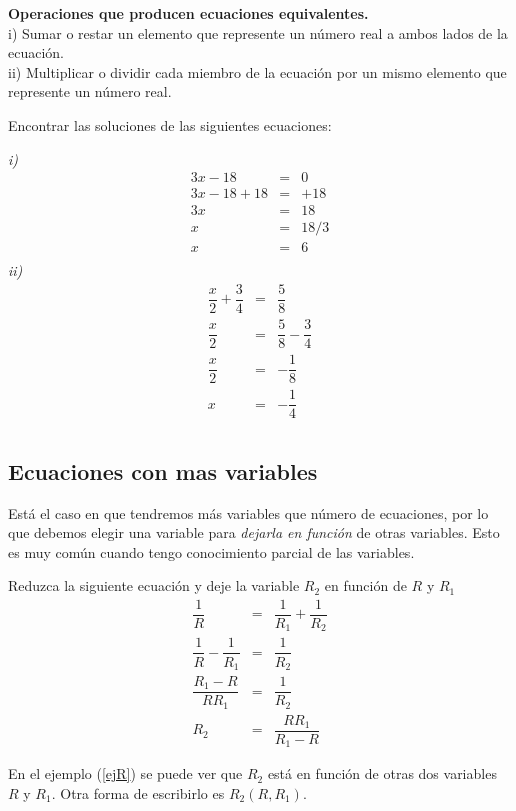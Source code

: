 \begin{mydef}
\textbf{Operaciones que producen ecuaciones equivalentes. }\\

\noindent i) Sumar o restar un elemento que represente un número real a ambos lados de la ecuación. \\

\noindent ii) Multiplicar o dividir cada miembro de la ecuación por un mismo elemento que represente un número real.\\
\end{mydef} 
\newpage
\begin{myexample}
Encontrar las soluciones de las siguientes ecuaciones:
\end{myexample}
\noindent\textit{i)}
\begin{eqnarray*}
3x-18&=&0\\
3x-18+18&=&+18\\
3x&=&18\\
x&=&18/3\\
x&=&6\\
\end{eqnarray*}
\noindent\textit{ii)}
\begin{eqnarray*}
\dfrac{x}{2}+\dfrac{3}{4}&=&\dfrac{5}{8}\\
\dfrac{x}{2}&=&\dfrac{5}{8}-\dfrac{3}{4}\\
\dfrac{x}{2}&=&-\dfrac{1}{8}\\
x&=&-\dfrac{1}{4}\\
\end{eqnarray*}

\subsection{Ecuaciones con mas variables}
Está el caso en que tendremos más variables que número de ecuaciones, por lo que debemos elegir una variable para \textit{dejarla en función} de otras variables. Esto es muy común cuando tengo conocimiento parcial de las variables.
\begin{myexample}
Reduzca la siguiente ecuación y deje la variable $R_{2}$ en función de  $R$ y $R_{1}$
\begin{eqnarray*}
\dfrac{1}{R}&=&\dfrac{1}{R_{1}}+\dfrac{1}{R_{2}}\\
\dfrac{1}{R}-\dfrac{1}{R_{1}}&=&\dfrac{1}{R_{2}}\\
\dfrac{R_{1}-R}{RR_{1}}&=&\dfrac{1}{R_{2}}\\
R_{2}&=&\dfrac{RR_{1}}{R_{1}-R}
\end{eqnarray*}
\label{ejR}
\end{myexample}
En el ejemplo (\ref{ejR}) se puede ver que $R_{2}$ está en función de otras dos variables $R$ y $R_{1}$. Otra forma de escribirlo es $R_{2}\left( R,R_{1}\right)$.

